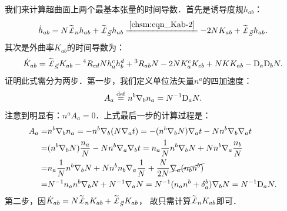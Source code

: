 

我们来计算超曲面上两个最基本张量的时间导数．首先是诱导度规$h_{ab}$：
\begin{equation}\label{chsm:eqn_Lie-t-hab}
    \dot{h}_{ab} = N \widetilde{\Lie}_{n}{h}_{ab}
    +\widetilde{\Lie}_{\vec{S}}{h}_{ab}
    \xlongequal{\ref{chsm:eqn_Kab-2}}
    -2N K_{ab}
    +\widetilde{\Lie}_{\vec{S}}{h}_{ab} .
\end{equation}
其次是外曲率$K_{ab}$的时间导数为：
\begin{equation}\label{chsm:eqn_Lie-t-Kab}
    \dot{K}_{ab} = \widetilde{\Lie}_{\vec{S}}{K}_{ab}-{}^4 R_{cd} N h^c_a h^d_b 
    + {}^3 R_{ab} N - 2N K^c_a K_{cb}  + N K K_{ab} - {\rm D}_a {\rm D}_b N .
\end{equation}
证明此式需分为两步．第一步，我们定义{\heiti 单位法矢量$n^a$的四加速度}：
\begin{equation}\label{chsm:eqn_Acceleration}
    A_a \overset{\mathrm {def}}{=} n^b \nabla_b n_a =N^{-1} {\rm D}_a N .
\end{equation}
注意到明显有：$n^a A_a =0 $．上式最后一步的计算过程是：  %
\begin{align*}
    A_a =& n^b \nabla_b n_a = -n^b\nabla_b ( N \nabla_a t )
    = -(n^b\nabla_b  N) \nabla_a t  -  N n^b\nabla_b  \nabla_a t \\
    =& (n^b\nabla_b  N) \frac{n_a}{N} -  N n^b\nabla_a  \nabla_b t 
    = n_a \frac{1}{N} n^b\nabla_b N   +  N n^b\nabla_a  \frac{n_b}{N}  \\
    =& n_a \frac{1}{N} n^b\nabla_b N + N n^b n_b \nabla_a \frac{1}{N} 
    +  \frac{N}{2N} {\cancel{\nabla_a  (n_bn^b)}} \\
    =& N^{-1} n_a n^b\nabla_b N + N^{-1} \nabla_a N
    = N^{-1} (n_a n^b + \delta^b_a )\nabla_b N
    =N^{-1} {\rm D}_a N .
\end{align*} %
第二步，因$\dot{K}_{ab} = N \widetilde{\Lie}_{n}{K}_{ab} +\widetilde{\Lie}_{\vec{S}}{K}_{ab}$，
故只需计算$\widetilde{\Lie}_{n}{K}_{ab}$即可．
